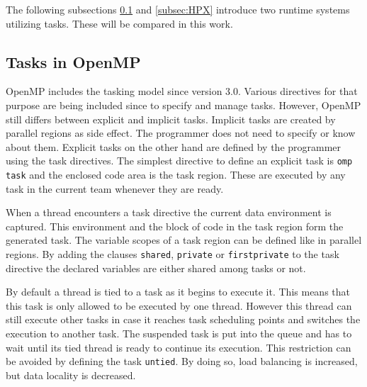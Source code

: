  	
  The following subsections \ref{subsec:OpenMP} and \ref{subsec:HPX} introduce two runtime systems utilizing tasks.
  These will be compared in this work.


\subsection{Tasks in OpenMP}
\label{subsec:OpenMP}
  OpenMP includes the tasking model since version 3.0.
  Various directives for that purpose are being included since to specify and manage  tasks.
  However, OpenMP still differs between explicit and implicit tasks.
  Implicit tasks are created by parallel regions as side effect.
  The programmer does not need to specify or know about them.
  Explicit tasks on the other hand are defined by the programmer using the task directives.
  The simplest directive to define an explicit task is \texttt{omp task} and the enclosed code area is the task region.
  These are executed by any task in the current team whenever they are ready.~\cite{Ayguade.2009}~\cite{LaGrone.2011}


  When a thread encounters a task directive the current data environment is captured.
  This environment and the block of code in the task region form the generated task.
  The variable scopes of a task region can be defined like in parallel regions.
  By adding the clauses \texttt{shared}, \texttt{private} or \texttt{firstprivate} to the task directive the declared variables are either shared among tasks or not.~\cite{Duran.2008}
  
  
  By default a thread is tied to a task as it begins to execute it.
  This means that this task is only allowed to be executed by one thread.
  However this thread can still execute other tasks in case it reaches task scheduling points and switches the execution to another task.
  The suspended task is put into the queue and has to wait until its tied thread is ready to continue its execution.
  This restriction can be avoided by defining the task \texttt{untied}.
  By doing so, load balancing is increased, but data locality is decreased.~\cite{Ayguade.2009}~\cite{LaGrone.2011}


